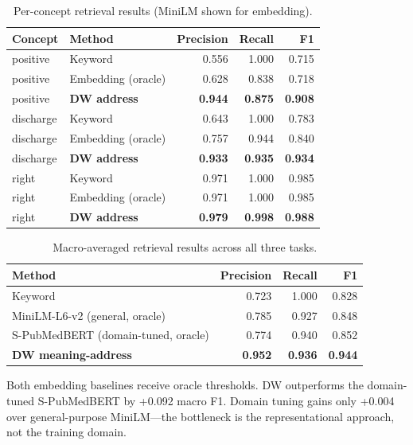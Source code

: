 \documentclass[11pt,a4paper]{article}
\begin{document}
\begin{table}[h]
\centering
\small
\begin{tabular}{llrrr}
\toprule
Concept & Method & Precision & Recall & F1 \\
\midrule
positive & Keyword & 0.556 & 1.000 & 0.715 \\
positive & Embedding (oracle) & 0.628 & 0.838 & 0.718 \\
positive & \textbf{DW address} & \textbf{0.944} & \textbf{0.875} & \textbf{0.908} \\
\midrule
discharge & Keyword & 0.643 & 1.000 & 0.783 \\
discharge & Embedding (oracle) & 0.757 & 0.944 & 0.840 \\
discharge & \textbf{DW address} & \textbf{0.933} & \textbf{0.935} & \textbf{0.934} \\
\midrule
right & Keyword & 0.971 & 1.000 & 0.985 \\
right & Embedding (oracle) & 0.971 & 1.000 & 0.985 \\
right & \textbf{DW address} & \textbf{0.979} & \textbf{0.998} & \textbf{0.988} \\
\bottomrule
\end{tabular}
\caption{Per-concept retrieval results (MiniLM shown for embedding).}
\label{tab:retrieval_detail}
\end{table}

\begin{table}[h]
\centering
\small
\begin{tabular}{lrrr}
\toprule
Method & Precision & Recall & F1 \\
\midrule
Keyword & 0.723 & 1.000 & 0.828 \\
MiniLM-L6-v2 (general, oracle) & 0.785 & 0.927 & 0.848 \\
S-PubMedBERT (domain-tuned, oracle) & 0.774 & 0.940 & 0.852 \\
\textbf{DW meaning-address} & \textbf{0.952} & \textbf{0.936} & \textbf{0.944} \\
\bottomrule
\end{tabular}
\caption{Macro-averaged retrieval results across all three tasks.}
\label{tab:retrieval_macro}
\end{table}

Both embedding baselines receive oracle thresholds. DW outperforms the domain-tuned S-PubMedBERT by +0.092 macro F1. Domain tuning gains only +0.004 over general-purpose MiniLM---the bottleneck is the representational approach, not the training domain.
\end{document}
